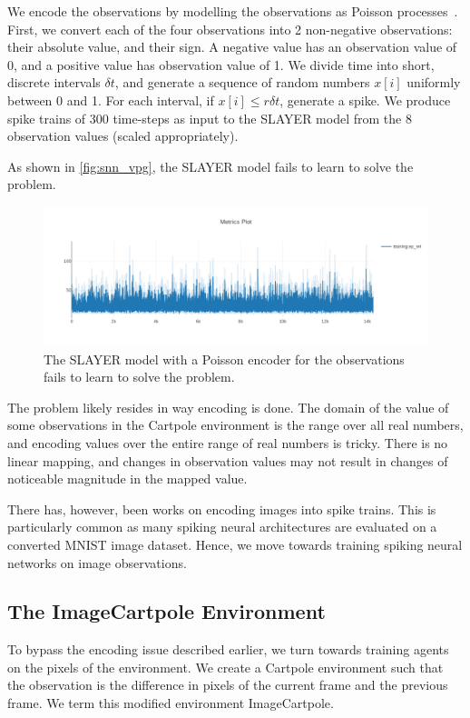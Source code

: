 \documentclass[fyp]{socreport}
\begin{document}
We encode the observations by modelling the observations as Poisson
processes~\cite{heeger2000poisson}. First, we convert each of the four
observations into 2 non-negative observations: their absolute value, and their
sign. A negative value has an observation value of 0, and a positive value has
observation value of 1. We divide time into short, discrete intervals
\(\delta t\), and generate a sequence of random numbers \(x[i]\) uniformly
between 0 and 1. For each interval, if \(x[i] \le r \delta t\), generate a
spike. We produce spike trains of 300 time-steps as input to the SLAYER model
from the 8 observation values (scaled appropriately).

As shown in \autoref{fig:snn_vpg}, the SLAYER model fails to learn to solve the
problem.

\begin{figure}[htbp] \centering
\includegraphics[width=.9\linewidth]{images/slayer_poisson.png}
\caption{\label{fig:snn_vpg} The SLAYER model with a Poisson encoder for the
observations fails to learn to solve the problem.}
\end{figure}

The problem likely resides in way encoding is done. The domain of the value of
some observations in the Cartpole environment is the range over all real
numbers, and encoding values over the entire range of real numbers is
tricky. There is no linear mapping, and changes in observation values may not
result in changes of noticeable magnitude in the mapped value.

There has, however, been works on encoding images into spike trains.  This is
particularly common as many spiking neural architectures are evaluated on a
converted MNIST image dataset. Hence, we move towards training spiking neural
networks on image observations.

\subsection{The ImageCartpole Environment}

To bypass the encoding issue described earlier, we turn towards training agents
on the pixels of the environment. We create a Cartpole environment such that the
observation is the difference in pixels of the current frame and the previous
frame. We term this modified environment ImageCartpole.
\end{document}
